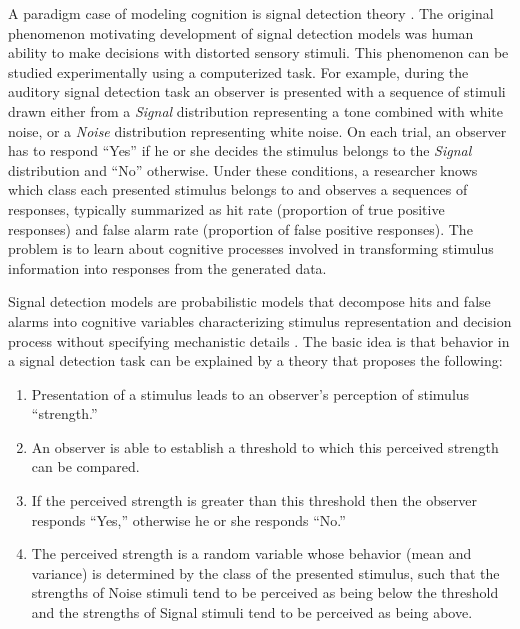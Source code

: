 \documentclass[12pt]{article}
\begin{document}
A paradigm case of modeling cognition is signal detection
theory \citep{MacCre2004}. The original phenomenon motivating development
of signal detection models was human ability to make decisions with
distorted sensory stimuli. This phenomenon can be studied experimentally
using a computerized task. For example, during the auditory signal
detection task an observer is presented with a sequence of stimuli drawn
either from a \textit{Signal} distribution representing a tone combined with
white noise, or a \textit{Noise} distribution representing white noise. On each
trial, an observer has to respond ``Yes'' if he or she decides the
stimulus belongs to the \textit{Signal} distribution and ``No'' otherwise. Under
these conditions, a researcher knows which class each presented stimulus
belongs to and observes a sequences of responses, typically summarized as
hit rate (proportion of true positive responses) and false alarm
rate (proportion of false positive responses). The problem is to
learn about cognitive processes involved in transforming stimulus
information into responses from the generated data.

Signal detection models are probabilistic models that decompose hits and false alarms into cognitive variables characterizing stimulus representation and decision process without specifying mechanistic details
\citep{MacCre2004,LeeWag2014}. The basic idea is that behavior in a
signal detection task can be explained by a theory that
proposes the following:
\begin{enumerate}
\item Presentation of a stimulus leads to an observer's perception of
      stimulus ``strength.''  
\item An observer is able to establish a threshold to which this perceived 
      strength can be compared.  
\item If the perceived strength is greater than this threshold then the 
      observer responds ``Yes,'' otherwise he or she responds ``No.''  
\item The perceived strength is a random variable whose behavior (mean and 
      variance) is determined by the class of the presented stimulus, such 
      that the strengths of Noise stimuli tend to be perceived as being below 
      the threshold and the strengths of Signal stimuli tend to be perceived 
      as being above.  
\end{enumerate} 
\end{document}
